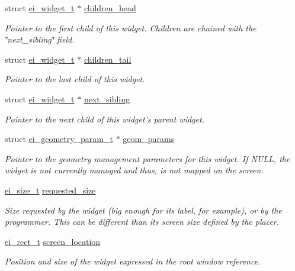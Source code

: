 \begin{DoxyCompactItemize}
struct \hyperlink{structei__widget__t}{ei\+\_\+widget\+\_\+t} $\ast$ \hyperlink{structei__widget__t_a190316f0ec41d2d98b919414c860f828}{children\+\_\+head}
\begin{DoxyCompactList}\small\item\em Pointer to the first child of this widget. Children are chained with the \char`\"{}next\+\_\+sibling\char`\"{} field. \end{DoxyCompactList}\item 
struct \hyperlink{structei__widget__t}{ei\+\_\+widget\+\_\+t} $\ast$ \hyperlink{structei__widget__t_aece2f3059f252538ae787857e7eea2a2}{children\+\_\+tail}
\begin{DoxyCompactList}\small\item\em Pointer to the last child of this widget. \end{DoxyCompactList}\item 
struct \hyperlink{structei__widget__t}{ei\+\_\+widget\+\_\+t} $\ast$ \hyperlink{structei__widget__t_ada15cedaf8e6e104a1461c1754ff6cb3}{next\+\_\+sibling}
\begin{DoxyCompactList}\small\item\em Pointer to the next child of this widget's parent widget. \end{DoxyCompactList}\item 
struct \hyperlink{structei__geometry__param__t}{ei\+\_\+geometry\+\_\+param\+\_\+t} $\ast$ \hyperlink{structei__widget__t_a31885277c641803a931fff1d6256203f}{geom\+\_\+params}
\begin{DoxyCompactList}\small\item\em Pointer to the geometry management parameters for this widget. If N\+U\+L\+L, the widget is not currently managed and thus, is not mapped on the screen. \end{DoxyCompactList}\item 
\hyperlink{structei__size__t}{ei\+\_\+size\+\_\+t} \hyperlink{structei__widget__t_ae82b19958b3ec72a855986dffb9b92ea}{requested\+\_\+size}
\begin{DoxyCompactList}\small\item\em Size requested by the widget (big enough for its label, for example), or by the programmer. This can be different than its screen size defined by the placer. \end{DoxyCompactList}\item 
\hyperlink{structei__rect__t}{ei\+\_\+rect\+\_\+t} \hyperlink{structei__widget__t_ad139e1541329b54e0b4c8d746e14b204}{screen\+\_\+location}
\begin{DoxyCompactList}\small\item\em Position and size of the widget expressed in the root window reference. \end{DoxyCompactList}\item 

\end{DoxyCompactItemize}

